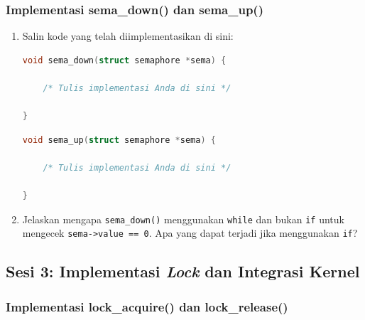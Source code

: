 \subsubsection{Implementasi sema\_down() dan sema\_up()}

\begin{enumerate}

	\item Salin kode yang telah diimplementasikan di sini:

	      \begin{lstlisting}[language=C, caption={Implementasi \texttt{sema\_down()} oleh mahasiswa}]
void sema_down(struct semaphore *sema) {

    /* Tulis implementasi Anda di sini */

}
    \end{lstlisting}

	      \begin{lstlisting}[language=C, caption={Implementasi \texttt{sema\_up()} oleh mahasiswa}]
void sema_up(struct semaphore *sema) {

    /* Tulis implementasi Anda di sini */

}
    \end{lstlisting}

	\item Jelaskan mengapa \texttt{sema\_down()} menggunakan \texttt{while} dan bukan \texttt{if} untuk mengecek \texttt{sema->value == 0}. Apa yang dapat terjadi jika menggunakan \texttt{if}?

\end{enumerate}

\subsection{Sesi 3: Implementasi \textit{Lock} dan Integrasi Kernel}

\subsubsection{Implementasi lock\_acquire() dan lock\_release()}

